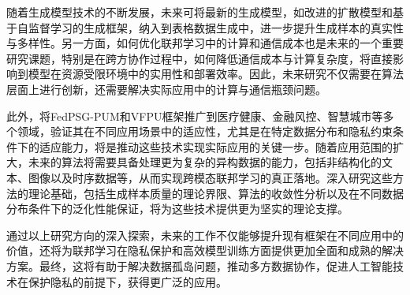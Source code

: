 随着生成模型技术的不断发展，未来可将最新的生成模型，如改进的扩散模型和基于自监督学习的生成框架，纳入到表格数据生成中，进一步提升生成样本的真实性与多样性。另一方面，如何优化联邦学习中的计算和通信成本也是未来的一个重要研究课题，特别是在跨方协作过程中，如何降低通信成本与计算复杂度，将直接影响到模型在资源受限环境中的实用性和部署效率。因此，未来研究不仅需要在算法层面上进行创新，还需要解决实际应用中的计算与通信瓶颈问题。

此外，将FedPSG-PUM和VFPU框架推广到医疗健康、金融风控、智慧城市等多个领域，验证其在不同应用场景中的适应性，尤其是在特定数据分布和隐私约束条件下的适应能力，将是推动这些技术实现实际应用的关键一步。随着应用范围的扩大，未来的算法将需要具备处理更为复杂的异构数据的能力，包括非结构化的文本、图像以及时序数据等，从而实现跨模态联邦学习的真正落地。深入研究这些方法的理论基础，包括生成样本质量的理论界限、算法的收敛性分析以及在不同数据分布条件下的泛化性能保证，将为这些技术提供更为坚实的理论支撑。

通过以上研究方向的深入探索，未来的工作不仅能够提升现有框架在不同应用中的价值，还将为联邦学习在隐私保护和高效模型训练方面提供更加全面和成熟的解决方案。最终，这将有助于解决数据孤岛问题，推动多方数据协作，促进人工智能技术在保护隐私的前提下，获得更广泛的应用。


